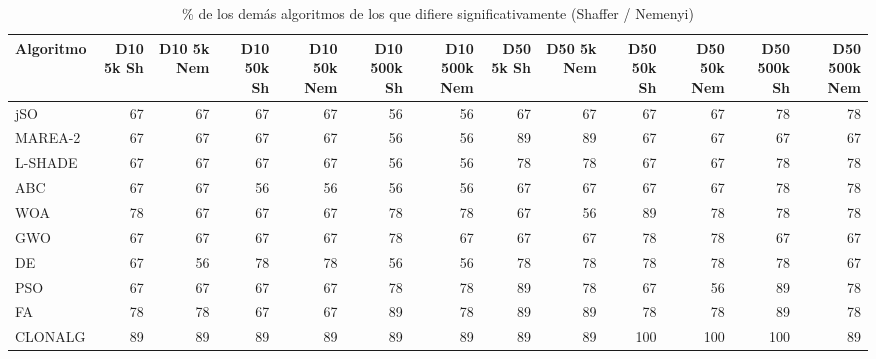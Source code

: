 \begin{table}[ht]\centering\small
\caption{\% de los demás algoritmos de los que difiere significativamente (Shaffer / Nemenyi)}
\begin{tabular}{lrrrrrrrrrrrr}
\toprule
Algoritmo & D10 5k Sh & D10 5k Nem & D10 50k Sh & D10 50k Nem & D10 500k Sh & D10 500k Nem & D50 5k Sh & D50 5k Nem & D50 50k Sh & D50 50k Nem & D50 500k Sh & D50 500k Nem \\
\midrule
jSO & 67 & 67 & 67 & 67 & 56 & 56 & 67 & 67 & 67 & 67 & 78 & 78 \\
MAREA-2 & 67 & 67 & 67 & 67 & 56 & 56 & 89 & 89 & 67 & 67 & 67 & 67 \\
L-SHADE & 67 & 67 & 67 & 67 & 56 & 56 & 78 & 78 & 67 & 67 & 78 & 78 \\
ABC & 67 & 67 & 56 & 56 & 56 & 56 & 67 & 67 & 67 & 67 & 78 & 78 \\
WOA & 78 & 67 & 67 & 67 & 78 & 78 & 67 & 56 & 89 & 78 & 78 & 78 \\
GWO & 67 & 67 & 67 & 67 & 78 & 67 & 67 & 67 & 78 & 78 & 67 & 67 \\
DE & 67 & 56 & 78 & 78 & 56 & 56 & 78 & 78 & 78 & 78 & 78 & 67 \\
PSO & 67 & 67 & 67 & 67 & 78 & 78 & 89 & 78 & 67 & 56 & 89 & 78 \\
FA & 78 & 78 & 67 & 67 & 89 & 78 & 89 & 89 & 78 & 78 & 89 & 78 \\
CLONALG & 89 & 89 & 89 & 89 & 89 & 89 & 89 & 89 & 100 & 100 & 100 & 89 \\
\bottomrule
\end{tabular}
\end{table}
